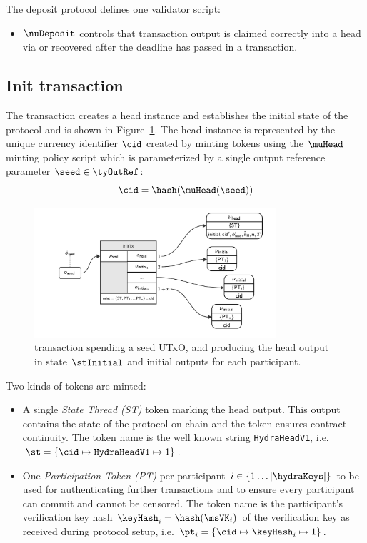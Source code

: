 \noindent The deposit protocol defines one validator script:
  \begin{itemize}
	\item $\nuDeposit$ controls that \mtxDeposit{} transaction output is
	claimed correctly into a head via \mtxIncrement{} or recovered after
	the deadline has passed in a \mtxRecover{} transaction.
  \end{itemize}

\subsection{Init transaction}\label{sec:init-tx}

The \mtxInit{} transaction creates a head instance and establishes the initial
state of the protocol and is shown in Figure~\ref{fig:initTx}. The head
instance is represented by the unique currency identifier $\cid$ created by
minting tokens using the $\muHead$ minting policy script which is parameterized
by a single output reference parameter $\seed \in \tyOutRef$:
\[
  \cid = \hash(\muHead(\seed))
\]

\begin{figure}
  \centering
  \includegraphics[width=0.8\textwidth]{Hydra/Protocol/Figures/initTx.pdf}
  \caption{\mtxInit{} transaction spending a seed UTxO, and producing the head
	output in state $\stInitial$ and initial outputs for each participant.}\label{fig:initTx}
\end{figure}

\noindent Two kinds of tokens are minted:
\begin{itemize}
  \item A single \emph{State Thread (ST)} token marking the head output. This
  output contains the state of the protocol on-chain and the token ensures
  contract continuity. The token name is the well known string
  \texttt{HydraHeadV1}, i.e.
  $\st = \{\cid \mapsto \texttt{HydraHeadV1} \mapsto 1\}$.
  \item One \emph{Participation Token (PT)} per participant
  $i \in \{1 \dots |\hydraKeys|  \}$ to be used for authenticating further
  transactions and to ensure every participant can commit and cannot be
  censored. The token name is the participant's verification key hash
  $\keyHash_{i} = \hash(\msVK_{i})$ of the verification key as received
  during protocol setup, i.e.
  $\pt_{i} = \{\cid \mapsto \keyHash_{i} \mapsto 1\}$.
\end{itemize}

